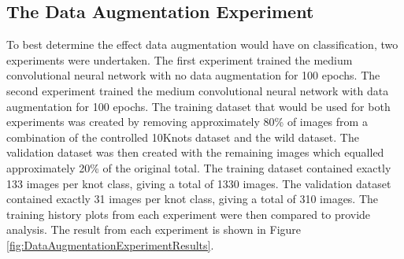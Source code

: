 \documentclass{l4proj}
\begin{document}
\subsection{The Data Augmentation Experiment}
To best determine the effect data augmentation would have on classification, two experiments were undertaken.
The first experiment trained the medium convolutional neural network with no data augmentation for 100 epochs.
The second experiment trained the medium convolutional neural network with data augmentation for 100 epochs.
The training dataset that would be used for both experiments was created by removing approximately 80\% of images from a combination of the controlled 10Knots dataset and the wild dataset.
The validation dataset was then created with the remaining images which equalled approximately 20\% of the original total.
The training dataset contained exactly 133 images per knot class, giving a total of 1330 images.
The validation dataset contained exactly 31 images per knot class, giving a total of 310 images.
The training history plots from each experiment were then compared to provide analysis.
The result from each experiment is shown in Figure \ref{fig:DataAugmentationExperimentResults}.
\end{document}
